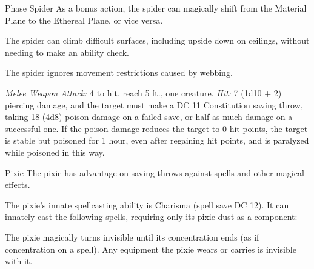 \documentclass[10pt,a4paper,twoside,bg=print,twocolumn,openany,nodeprecatedcode]{dndbook}
\begin{document}
\begin{DndMonster}[float=t]{Phase Spider}
\DndMonsterBasics[
armor-class = {13 (natural armor)},
hit-points = {\DndDice{5d10 + 5}},
speed = {30 ft., climb 30 ft.}
]
\DndMonsterAbilityScores[
 str = 15,
 dex = 15,
 con = 12,
 int = 6,
 wis = 10,
 cha = 6
]
\DndMonsterDetails[
skills = {Stealth +6},
senses = {darkvision 60 ft., passive perception 10},
challenge = 3,
]
As a bonus action, the spider can magically shift from the Material Plane to the Ethereal Plane, or vice versa.

The spider can climb difficult surfaces, including upside down on ceilings, without needing to make an ability check.

The spider ignores movement restrictions caused by webbing.

\textsl{Melee Weapon Attack:} 4 to hit, reach 5 ft., one creature. \textsl{Hit:} 7 (1d10 + 2) piercing damage, and the target must make a DC 11 Constitution saving throw, taking 18 (4d8) poison damage on a failed save, or half as much damage on a successful one. If the poison damage reduces the target to 0 hit points, the target is stable but poisoned for 1 hour, even after regaining hit points, and is paralyzed while poisoned in this way.

\end{DndMonster}



\begin{DndMonster}[float=t]{Pixie}
\DndMonsterBasics[
armor-class = {15},
hit-points = {\DndDice{1d4 - 1}},
speed = {10 ft., fly 30 ft.}
]
\DndMonsterAbilityScores[
 str = 2,
 dex = 20,
 con = 8,
 int = 10,
 wis = 14,
 cha = 15
]
\DndMonsterDetails[
skills = {Perception +4, Stealth +7},
languages = {Sylvan},
challenge = 1/4,
]
The pixie has advantage on saving throws against spells and other magical effects.

The pixie's innate spellcasting ability is Charisma (spell save DC 12). It can innately cast the following spells, requiring only its pixie dust as a component:
\begin{DndMonsterSpells}
\end{DndMonsterSpells}
The pixie magically turns invisible until its concentration ends (as if concentration on a spell). Any equipment the pixie wears or carries is invisible with it.

\end{DndMonster}
\end{document}
